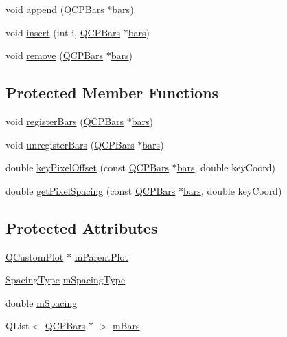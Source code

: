 \begin{DoxyCompactItemize}
void \hyperlink{class_q_c_p_bars_group_a809ed63cc4ff7cd5b0b8c96b470163d3}{append} (\hyperlink{class_q_c_p_bars}{Q\+C\+P\+Bars} $\ast$\hyperlink{class_q_c_p_bars_group_a7c72ed1f8cd962c93b8c42ab96cd91ec}{bars})
\item 
void \hyperlink{class_q_c_p_bars_group_a309a5f7233db189f3ea9c2d04ece6c13}{insert} (int i, \hyperlink{class_q_c_p_bars}{Q\+C\+P\+Bars} $\ast$\hyperlink{class_q_c_p_bars_group_a7c72ed1f8cd962c93b8c42ab96cd91ec}{bars})
\item 
void \hyperlink{class_q_c_p_bars_group_a215e28a5944f1159013a0e19169220e7}{remove} (\hyperlink{class_q_c_p_bars}{Q\+C\+P\+Bars} $\ast$\hyperlink{class_q_c_p_bars_group_a7c72ed1f8cd962c93b8c42ab96cd91ec}{bars})
\end{DoxyCompactItemize}
\subsection*{Protected Member Functions}
\begin{DoxyCompactItemize}
\item 
void \hyperlink{class_q_c_p_bars_group_a7b00514f19ad58d0bb3fd5246a67fae2}{register\+Bars} (\hyperlink{class_q_c_p_bars}{Q\+C\+P\+Bars} $\ast$\hyperlink{class_q_c_p_bars_group_a7c72ed1f8cd962c93b8c42ab96cd91ec}{bars})
\item 
void \hyperlink{class_q_c_p_bars_group_ac7073cdd7b1a40c6cb4b5f908145f8c4}{unregister\+Bars} (\hyperlink{class_q_c_p_bars}{Q\+C\+P\+Bars} $\ast$\hyperlink{class_q_c_p_bars_group_a7c72ed1f8cd962c93b8c42ab96cd91ec}{bars})
\item 
double \hyperlink{class_q_c_p_bars_group_a8e2ca6002e7bab49670144d048a2bcc9}{key\+Pixel\+Offset} (const \hyperlink{class_q_c_p_bars}{Q\+C\+P\+Bars} $\ast$\hyperlink{class_q_c_p_bars_group_a7c72ed1f8cd962c93b8c42ab96cd91ec}{bars}, double key\+Coord)
\item 
double \hyperlink{class_q_c_p_bars_group_a0beccd41bc3841a4c5b284823bc7d2de}{get\+Pixel\+Spacing} (const \hyperlink{class_q_c_p_bars}{Q\+C\+P\+Bars} $\ast$\hyperlink{class_q_c_p_bars_group_a7c72ed1f8cd962c93b8c42ab96cd91ec}{bars}, double key\+Coord)
\end{DoxyCompactItemize}
\subsection*{Protected Attributes}
\begin{DoxyCompactItemize}
\item 
\hyperlink{class_q_custom_plot}{Q\+Custom\+Plot} $\ast$ \hyperlink{class_q_c_p_bars_group_a973d408cfbf88db95115aec71877f9e7}{m\+Parent\+Plot}
\item 
\hyperlink{class_q_c_p_bars_group_a4c0521120a97e60bbca37677a37075b6}{Spacing\+Type} \hyperlink{class_q_c_p_bars_group_a6794ee1a9c81864d627bff6a4b2d64ec}{m\+Spacing\+Type}
\item 
double \hyperlink{class_q_c_p_bars_group_a56471d7f548ca6141b7a5bf9629f7ece}{m\+Spacing}
\item 
Q\+List$<$ \hyperlink{class_q_c_p_bars}{Q\+C\+P\+Bars} $\ast$ $>$ \hyperlink{class_q_c_p_bars_group_affdb1e9233c277ff5a4c0a1121cf1fc0}{m\+Bars}
\end{DoxyCompactItemize}
